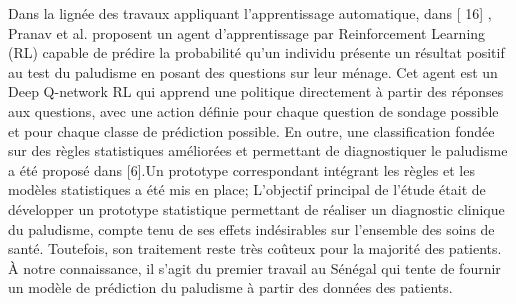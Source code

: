 Dans la lignée des travaux appliquant l’apprentissage automatique, dans [ 16] , Pranav et al. proposent un agent d'apprentissage par Reinforcement Learning  (RL) capable de prédire la probabilité qu'un individu présente un résultat positif au test du paludisme en posant des questions sur leur ménage. Cet agent est un Deep Q-network  RL qui apprend une politique directement à partir des réponses aux questions, avec une action définie pour chaque question de sondage possible et pour chaque classe de prédiction possible. En outre, une classification fondée sur des règles statistiques  améliorées et permettant de diagnostiquer le paludisme a été proposé dans [6].Un prototype correspondant intégrant les règles et les modèles statistiques a été mis en place; L’objectif principal de l’étude était de développer un prototype statistique permettant de réaliser un diagnostic clinique du paludisme, compte tenu de ses effets indésirables sur l’ensemble des soins de santé. Toutefois, son traitement reste très coûteux pour la majorité des patients.
À notre connaissance, il s’agit du premier travail au Sénégal qui tente de fournir un modèle de prédiction du paludisme à partir des données des patients.


